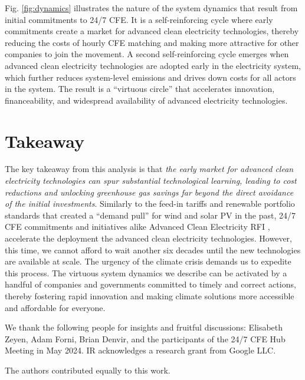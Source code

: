 \documentclass[pdflatex,sn-basic, Numbered]{sn-jnl}%
\theoremstyle{thmstyleone}%
\theoremstyle{thmstyletwo}%
\theoremstyle{thmstylethree}%
\begin{document}
Fig. \ref{fig:dynamics} illustrates the nature of the system dynamics that result from initial commitments to 24/7 CFE. It is a self-reinforcing cycle where early commitments create a market for advanced clean electricity technologies, thereby reducing the costs of hourly CFE matching and making more attractive for other companies to join the movement. A second self-reinforcing cycle emerges when advanced clean electricity technologies are adopted early in the electricity system, which further reduces system-level emissions and drives down costs for all actors in the system. The result is a \enquote{virtuous circle} that accelerates innovation, financeability, and widespread availability of advanced electricity technologies.

\section*{Takeaway}\label{sec6}

The key takeaway from this analysis is that \textit{the early market for advanced clean electricity technologies can spur substantial technological learning, leading to cost reductions and unlocking greenhouse gas savings far beyond the direct avoidance of the initial investments}. Similarly to the feed-in tariffs and renewable portfolio standards that created a \enquote{demand pull} for wind and solar PV in the past, 24/7 CFE commitments and initiatives alike Advanced Clean Electricity RFI \cite{GoogleMicrosoftNucor}, accelerate the deployment the advanced clean electricity technologies. However, this time, we cannot afford to wait another six decades until the new technologies are available at scale. The urgency of the climate crisis demands us to expedite this process. The virtuous system dynamics we describe can be activated by a handful of companies and governments committed to timely and correct actions, thereby fostering rapid innovation and making climate solutions more accessible and affordable for everyone.

\backmatter

 We thank the following people for insights and fruitful discussions: Elisabeth Zeyen, Adam Forni, Brian Denvir, and the participants of the 24/7 CFE Hub Meeting in May 2024. IR acknowledges a research grant from Google LLC.

 The authors contributed equally to this work.
\end{document}
